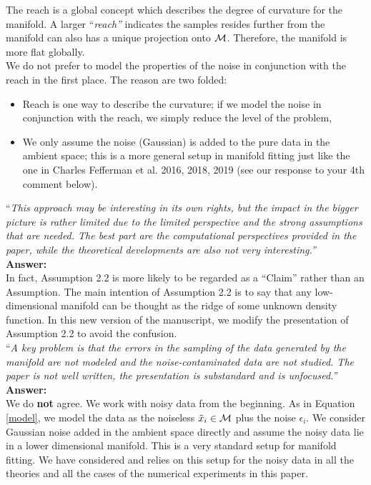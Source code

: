 \documentclass[12pt]{article}
\begin{document}
The reach is a global concept which describes the degree of curvature for the manifold. A larger {``\it reach''} indicates the samples resides further from the manifold can also has a unique projection onto $\cal M$. Therefore, the manifold is more flat globally.\\

We do not prefer to model the properties of the noise in conjunction with the reach in the first place. The reason are two folded:
\begin{itemize}
\item Reach is one way to describe the curvature; if we model the noise in conjunction with the reach, we simply reduce the level of the problem,
\item We only assume the noise (Gaussian) is added to the pure data in the ambient space; this is a more general setup in manifold fitting just like the one in Charles Fefferman et al. 2016, 2018, 2019 (see our response to your 4th comment below). 
\end{itemize}


\noindent ``\textit{This approach may be interesting in its own rights, but the impact in the bigger picture is rather limited due to the limited perspective and the strong assumptions that are needed. The best part are the computational perspectives provided in the paper, while the theoretical developments are also not very interesting.'' }\\

{\bf Answer:}\\
In fact, Assumption 2.2 is more likely to be regarded as a ``Claim'' rather than an Assumption. The main intention of Assumption 2.2 is to say that any low-dimensional manifold can be thought as the ridge of some unknown density function. In this new version of the manuscript, we modify the presentation of Assumption 2.2 to avoid the confusion.\\


\noindent ``\textit {A key problem is that the errors in the sampling of the data generated by the manifold are not modeled and the noise-contaminated data are not studied. The paper is not well written, the presentation is substandard  and is unfocused.''}\\

{\bf Answer:}\\
We do {\bf not} agree. We work with noisy data from the beginning. As in Equation \eqref{model}, we model the data as the noiseless $\tilde{x}_i\in \cal M$ plus the noise $\epsilon_i$. We consider Gaussian noise added  in the ambient space directly and assume the noisy data lie in a lower dimensional manifold.  This is a very standard setup for manifold fitting. We have considered and relies on this setup for the noisy data in all the theories and all the cases of the numerical experiments in this paper.\\
\end{document}
